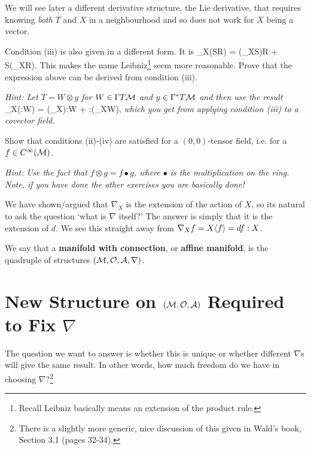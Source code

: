 We will see later a different derivative structure, the Lie derivative, that requires knowing \textit{both} $T$ and $X$ in a neighbourhood and so does not work for $X$ being a vector. 

\bbox
    Condition (iii) is also given in a different form. It is
    \bse 
        \nabla_X(S\otimes R) = (\nabla_XS)\otimes R + S\otimes (\nabla_XR).
    \ese
    This makes the name Leibniz\footnote{Recall Leibniz basically means an extension of the product rule.} seem more reasonable. Prove that the expression above can be derived from condition (iii). 
    
    \textit{Hint: Let $T=W\otimes y$ for $W\in\Gamma T\mathcal{M}$ and $y\in \Gamma^*T\mathcal{M}$ and then use the result}
    \bse 
        \nabla_X(\omega:W) = (\nabla_X\omega):W + \omega:(\nabla_XW),
    \ese 
    \textit{which you get from applying condition (iii) to a covector field.}
\ebox

\bbox 
    Show that conditions (ii)-(iv) are satisfied for a $(0,0)$-tensor field, i.e. for a $f\in C^{\infty}(\mathcal{M})$.
    
    \textit{Hint: Use the fact that $f\otimes g = f\bullet g$, where $\bullet$ is the multiplication on the ring. Note, if you have done the other exercises you are basically done!}
    
\ebox  

\br 
    We have shown/argued that $\nabla_X$ is the extension of the action of $X$, so its natural to ask the question `what is $\nabla$ itself?' The answer is simply that it is the extension of $d$. We see this straight away from $\nabla_Xf = X\langle f\rangle = df:X$.
\er 

    We say that a \textbf{manifold with connection}, or \textbf{affine manifold}, is the quadruple of structures $(\mathcal{M},\mathcal{O},\mathcal{A},\nabla)$.
\ed 

\section{\texorpdfstring{New Structure on $(\mathcal{M},\mathcal{O},\mathcal{A})$ Required to Fix $\nabla$}{New Structure on (M,O,A) Required to Fix nabla}}

The question we want to answer is whether this is unique or whether different $\nabla$s will give the same result. In other words, how much freedom do we have in choosing $\nabla$?\footnote{There is a slightly more generic, nice discussion of this given in Wald's book, Section 3.1 (pages 32-34).}

